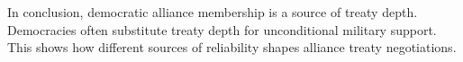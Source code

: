 \documentclass[12pt]{article}
\begin{document}
In conclusion, democratic alliance membership is a source of treaty depth. 
Democracies often substitute treaty depth for unconditional military support. 
This shows how different sources of reliability shapes alliance treaty negotiations. 



\singlespace
 
 
\end{document}
